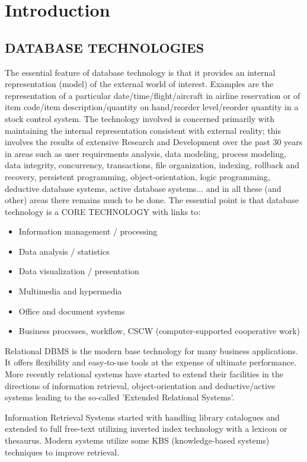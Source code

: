 \chapter{Introduction}

\section{DATABASE TECHNOLOGIES}
The essential feature of database technology is that it provides an internal representation (model) of the external world of interest. Examples are the representation of a particular date/time/flight/aircraft in airline reservation or of item code/item description/quantity on hand/reorder level/reorder quantity in a stock control system. The technology involved is concerned primarily with maintaining the internal representation consistent with external reality; this involves the results of extensive Research and Development over the past 30 years in areas such as user requirements analysis, data modeling, process modeling, data integrity, concurrency, transactions, file organization, indexing, rollback and recovery, persistent programming, object-orientation, logic programming, deductive database systems, active database systems... and in all these (and other) areas there remains much to be done. The essential point is that database technology is a CORE TECHNOLOGY with links to:
\begin{itemize}
\item{Information management / processing}
\item{Data analysis / statistics}
\item{Data visualization / presentation}
\item{Multimedia and hypermedia}
\item{Office and document systems}
\item{Business processes, workflow, CSCW (computer-supported cooperative work)}
\end{itemize}
Relational DBMS is the modern base technology for many business applications. It offers flexibility and easy-to-use tools at the expense of ultimate performance. More recently relational systems have started to extend their facilities in the directions of information retrieval, object-orientation and deductive/active systems leading to the so-called 'Extended
Relational Systems'.

Information Retrieval Systems started with handling library catalogues and extended to full free-text utilizing inverted index technology with a lexicon or thesaurus. Modern systems utilize some KBS (knowledge-based systems) techniques to improve retrieval.

